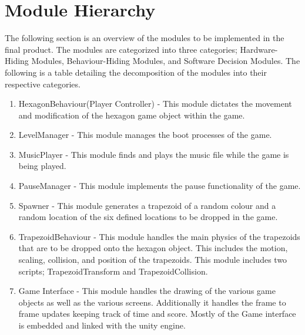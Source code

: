 \documentclass[12pt, titlepage]{article}
\begin{document}
\section{Module Hierarchy}
The following section is an overview of the modules to be implemented in the final product. The modules are categorized into three categories; Hardware-Hiding Modules, Behaviour-Hiding Modules, and Software Decision Modules. The following is a table detailing the decomposition of the modules into their respective categories.

\begin{enumerate}[label=\textbf{M\arabic*:}]
\item HexagonBehaviour(Player Controller) - This module dictates the movement and modification of the hexagon game object within the game.
\item LevelManager - This module manages the boot processes of the game.
\item MusicPlayer - This module finds and plays the music file while the game is being played.
\item PauseManager - This module implements the pause functionality of the game.
\item Spawner - This module generates a trapezoid of a random colour and a random location of the six defined locations to be dropped in the game.
\item TrapezoidBehaviour - This module handles the main physics of the trapezoids that are to be dropped onto the hexagon object. This includes the motion, scaling, collision, and position of the trapezoids. This module includes two scripts; TrapezoidTransform and TrapezoidCollision.
\item Game Interface - This module handles the drawing of the various game objects as well as the various screens. Additionally it handles the frame to frame updates keeping track of time and score. Mostly of the Game interface is embedded and linked with the unity engine.
\end{enumerate}
\end{document}
